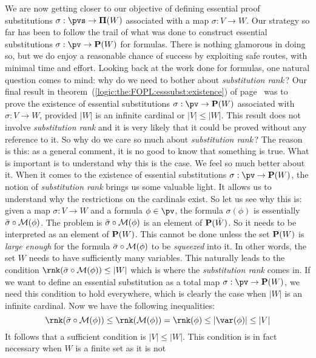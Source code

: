 We are now getting closer to our objective of defining essential
proof substitutions $\sigma:\pvs\to{\bf\Pi}(W)$ associated with a
map $\sigma:V\to W$. Our strategy so far has been to follow the
trail of what was done to construct essential substitutions
$\sigma:\pv\to{\bf P}(W)$ for formulas. There is nothing glamorous
in doing so, but we do enjoy a reasonable chance of success by
exploiting safe routes, with minimal time and effort. Looking back
at the work done for formulas, one natural question comes to mind:
why do we need to bother about {\em substitution rank}\,? Our final
result in theorem~(\ref{logic:the:FOPL:esssubst:existence}) of
page~\pageref{logic:the:FOPL:esssubst:existence} was to prove the
existence of essential substitutions $\sigma:\pv\to{\bf P}(W)$
associated with $\sigma:V\to W$, provided $|W|$ is an infinite
cardinal or $|V|\leq|W|$. This result does not involve {\em
substitution rank} and it is very likely that it could be proved
without any reference to it. So why do we care so much about {\em
substitution rank}\,? The reason is this: as a general comment, it
is no good to know that something is true. What is important is to
understand why this is the case. We feel so much better about it.
When it comes to the existence of essential substitutions
$\sigma:\pv\to{\bf P}(W)$, the notion of {\em substitution rank}
brings us some valuable light. It allows us to understand why the
restrictions on the cardinals exist. So let us see why this is:
given a map $\sigma:V\to W$ and a formula $\phi\in\pv$, the formula
$\sigma(\phi)$ is essentially $\bar{\sigma}\circ{\cal M}(\phi)$. The
problem is $\bar{\sigma}\circ{\cal M}(\phi)$ is an element of ${\bf
P}(\bar{W})$. So it needs to be interpreted as an element of ${\bf
P}(W)$. This cannot be done unless the set ${\bf P}(W)$ is {\em
large enough} for the formula $\bar{\sigma}\circ{\cal M}(\phi)$ to
be {\em squeezed} into it. In other words, the set $W$ needs to have
sufficiently many variables. This naturally leads to the condition
$\rnk(\bar{\sigma}\circ{\cal M}(\phi))\leq|W|$ which is where the
{\em substitution rank} comes in. If we want to define an essential
substitution as a total map $\sigma:\pv\to{\bf P}(W)$, we need this
condition to hold everywhere, which is clearly the case when $|W|$
is an infinite cardinal. Now we have the following inequalities:
    \[
    \rnk(\bar{\sigma}\circ{\cal M}(\phi))\leq\rnk({\cal
    M}(\phi))=\rnk(\phi)\leq|\var(\phi)|\leq|V|
    \]
It follows that a sufficient condition is $|V|\leq|W|$. This
condition is in fact necessary when $W$ is a finite set as it is not
